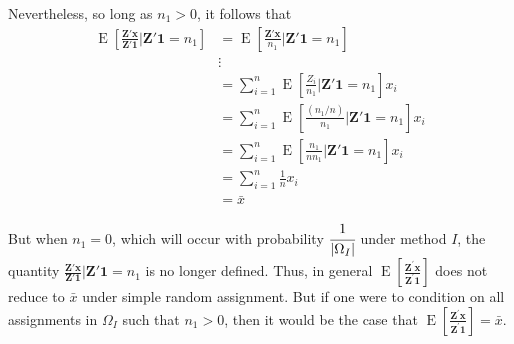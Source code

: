 \documentclass[
  12pt,
  leqno]{article}
\DeclareMathOperator{\E}{\mathrm{E}}
\DeclareMathOperator{\1}{\mathbbm{1}}
\begin{document}
Nevertheless, so long as \(n_1 > 0\), it follows that \begin{align*}
\E\left[\frac{\mathbf{Z}'\mathbf{x}}{\mathbf{Z}'\mathbf{1}}\big| \mathbf{Z}' \mathbf{1} = n_{1}\right] & = \E\left[\frac{\mathbf{Z}'\mathbf{x}}{n_1}\big| \mathbf{Z}' \mathbf{1} = n_{1}\right] \\
& \vdots \\
& = \sum \limits_{i = 1}^n \E\left[\frac{Z_{i}}{n_{1}} \big| \mathbf{Z}'\mathbf{1} = n_{1} \right] x_i \\ 
& = \sum \limits_{i = 1}^n \E\left[\frac{\left(n_1/n\right)}{n_{1}} \big| \mathbf{Z}'\mathbf{1} = n_{1} \right] x_i \\ 
& = \sum \limits_{i = 1}^n \E\left[\frac{n_1}{n n_{1}} \big| \mathbf{Z}'\mathbf{1} = n_{1} \right] x_i \\ 
& = \sum \limits_{i = 1}^n \frac{1}{n} x_i \\ 
& = \bar{x}
\end{align*}

But when \(n_1 = 0\), which will occur with probability
\(\cfrac{1}{\left\lvert \Omega_I \right\rvert}\) under method \(I\), the
quantity
\(\frac{\mathbf{Z}'\mathbf{x}}{\mathbf{Z}'\mathbf{1}}\big| \mathbf{Z}' \mathbf{1} = n_{1}\)
is no longer defined. Thus, in general
\(\E\left[\frac{\mathbf{Z}^{\prime}\mathbf{x}}{\mathbf{Z}^{\prime}\mathbf{1}}\right]\)
does not reduce to \(\bar{x}\) under simple random assignment. But if
one were to condition on all assignments in \(\Omega_I\) such that
\(n_1 > 0\), then it would be the case that
\(\E\left[\frac{\mathbf{Z}^{\prime}\mathbf{x}}{\mathbf{Z}^{\prime}\mathbf{1}}\right] = \bar{x}\).

\newpage

\renewcommand\refname{References}
  
\end{document}
